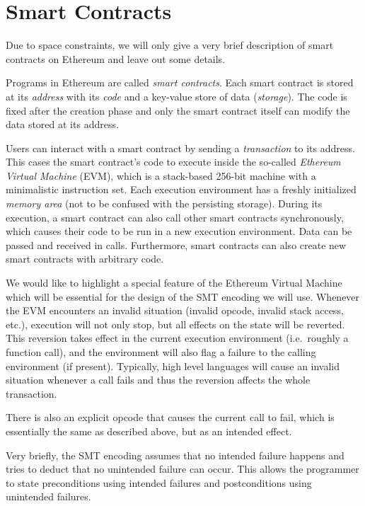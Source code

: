 \section{Smart Contracts}

Due to space constraints, we will only give a very brief description
of smart contracts on Ethereum and leave out some details.

Programs in Ethereum are called \emph{smart contracts}.
Each smart contract is stored at its \emph{address} with its \emph{code}
and a key-value store of data (\emph{storage}). The code is fixed after the creation phase
and only the smart contract itself can modify the data stored at its address.

Users can interact with a smart contract by sending a \emph{transaction}
to its address. This cases the smart contract's code to execute inside
the so-called \emph{Ethereum Virtual Machine} (EVM), which is a stack-based
256-bit machine with a minimalistic instruction set. Each execution environment
has a freshly initialized \emph{memory area} (not to be confused with the persisting
storage). During its execution, a smart contract can also call other
smart contracts synchronously, which causes their code to be run in
a new execution environment. Data can be passed and received in calls.
Furthermore, smart contracts can also create new smart contracts with
arbitrary code.

We would like to highlight a special feature of the Ethereum Virtual Machine
which will be essential for the design of the SMT encoding we will use.
Whenever the EVM encounters an invalid situation (invalid opcode, invalid
stack access, etc.), execution will not only stop, but all effects on the
state will be reverted. This reversion takes effect in the current execution
environment (i.e.\ roughly a function call), and the environment will also
flag a failure to the calling environment (if present). Typically, high level languages
will cause an invalid situation whenever a call fails and thus the reversion
affects the whole transaction.

There is also an explicit opcode that causes the current call to fail, which is
essentially the same as described above, but as an intended effect.

Very briefly, the SMT encoding assumes that no intended failure happens
and tries to deduct that no unintended failure can occur. This allows the
programmer to state preconditions using intended failures and postconditions
using unintended failures.